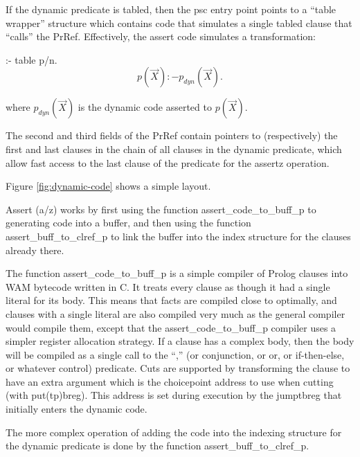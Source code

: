 \documentclass[11pt]{article}
\begin{document}
If the dynamic predicate is tabled, then the psc entry point points to
a ``table wrapper'' structure which contains code that simulates a
single tabled clause that ``calls'' the PrRef.  Effectively, the
assert code simulates a transformation:
\begin{center}
:- table p/n.
\[
p(\vec{X}):- p_{dyn}(\vec{X}). 
\]
\end{center}
where $p_{dyn}(\vec{X})$ is the dynamic code asserted to $p(\vec{X})$.

The second and third fields of the PrRef contain pointers to
(respectively) the first and last clauses in the chain of all clauses
in the dynamic predicate, which allow fast access to the last clause
of the predicate for the assertz operation.

Figure \ref{fig:dynamic-code} shows a simple layout.

Assert (a/z) works by first using the function
assert\_code\_to\_buff\_p to generating code into a buffer, and then using
the function assert\_buff\_to\_clref\_p to link the buffer into the index
structure for the clauses already there.

The function assert\_code\_to\_buff\_p is a simple compiler of Prolog
clauses into WAM bytecode written in C.  It treats every clause as
though it had a single literal for its body.  This means that facts
are compiled close to optimally, and clauses with a single literal are
also compiled very much as the general compiler would compile them,
except that the assert\_code\_to\_buff\_p compiler uses a simpler
register allocation strategy.  If a clause has a complex body, then
the body will be compiled as a single call to the ``,'' (or
conjunction, or or, or if-then-else, or whatever control) predicate.
Cuts are supported by transforming the clause to have an extra
argument which is the choicepoint address to use when cutting (with
put(tp)breg).  This address is set during execution by the jumptbreg
that initially enters the dynamic code.

The more complex operation of adding the code into the indexing
structure for the dynamic predicate is done by the function
assert\_buff\_to\_clref\_p.
\end{document}
